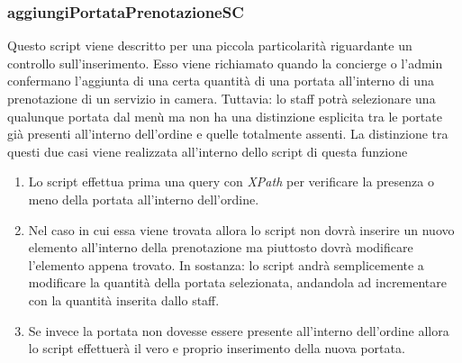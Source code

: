 \documentclass [a4paper, 12pt]{book}
\begin{document}
\subsubsection{aggiungiPortataPrenotazioneSC}
Questo script viene descritto per una piccola particolarità riguardante un controllo sull'inserimento. Esso viene richiamato quando la concierge o l'admin confermano l'aggiunta di una certa quantità di una portata all'interno di una prenotazione di un servizio in camera. Tuttavia: lo staff potrà selezionare una qualunque portata dal menù ma non ha una distinzione esplicita tra le portate già presenti all'interno dell'ordine e quelle totalmente assenti. La distinzione tra questi due casi viene realizzata all'interno dello script di questa funzione
\begin{enumerate}
\item Lo script effettua prima una query con \textit{XPath} per verificare la presenza o meno della portata all'interno dell'ordine.
\item Nel caso in cui essa viene trovata allora lo script non dovrà inserire un nuovo elemento all'interno della prenotazione ma piuttosto dovrà modificare l'elemento appena trovato. In sostanza: lo script andrà semplicemente a modificare la quantità della portata selezionata, andandola ad incrementare con la quantità inserita dallo staff.
\item Se invece la portata non dovesse essere presente all'interno dell'ordine allora lo script effettuerà il vero e proprio inserimento della nuova portata.
\end{enumerate}
\end{document}
